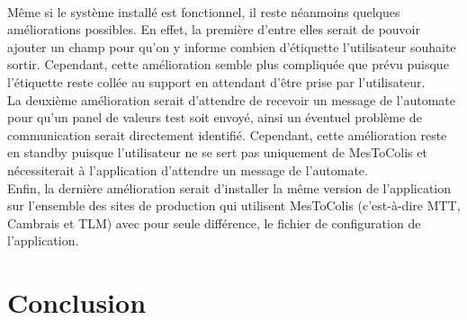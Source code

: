 \documentclass[a4paper,12pt]{extarticle}
\begin{document}
		\paragraph{}
	
	Même si le système installé est fonctionnel, il reste néanmoins quelques améliorations possibles. En effet, la première d’entre elles serait de pouvoir ajouter un champ pour qu’on y informe combien d’étiquette l’utilisateur souhaite sortir. Cependant, cette amélioration semble plus compliquée que prévu puisque l’étiquette reste collée au support en attendant d’être prise par l'utilisateur.\\
La deuxième amélioration serait d’attendre de recevoir un message de l’automate pour qu’un panel de valeurs test soit envoyé, ainsi un éventuel problème de communication serait directement identifié. Cependant, cette amélioration reste en standby puisque l’utilisateur ne se sert pas uniquement de MesToColis et nécessiterait à l’application d’attendre un message de l’automate.\\
Enfin, la dernière amélioration serait d’installer la même version de l’application sur l’ensemble des sites de production qui utilisent MesToColis (c’est-à-dire MTT, Cambrais et TLM) avec pour seule différence, le fichier de configuration de l’application.\\
		
	\clearpage
	
	\section{Conclusion}
		\paragraph{}
			
\end{document}
